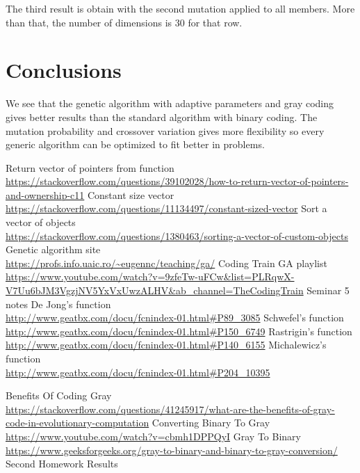 \documentclass[12pt,leqno]{article}
\begin{document}
The third result is obtain with the second mutation applied to all members. More than that, the number of dimensions is 30 for that row.

\section{Conclusions}
  We see that the genetic algorithm with adaptive parameters and gray coding gives better results than the standard algorithm with
  binary coding. The mutation probability and crossover variation gives more flexibility so every generic algorithm can be optimized
  to fit better in problems.

\newpage

\begin{thebibliography}{9}
  \bibitem{}
    Return vector of pointers from function \\
    \url{https://stackoverflow.com/questions/39102028/how-to-return-vector-of-pointers-and-ownership-c11}
  \bibitem{}
    Constant size vector \\
    \url{https://stackoverflow.com/questions/11134497/constant-sized-vector}
  \bibitem{}
    Sort a vector of objects \\
    \url{https://stackoverflow.com/questions/1380463/sorting-a-vector-of-custom-objects}  
  \bibitem{}
    Genetic algorithm site \\
    \url{https://profs.info.uaic.ro/~eugennc/teaching/ga/}  
  \bibitem{}
    Coding Train GA playlist \\
    \url{https://www.youtube.com/watch?v=9zfeTw-uFCw&list=PLRqwX-V7Uu6bJM3VgzjNV5YxVxUwzALHV&ab_channel=TheCodingTrain}  
  \bibitem{}
    Seminar 5 notes
  \bibitem{}
    De Jong's function \\
    \url{http://www.geatbx.com/docu/fcnindex-01.html#P89_3085}
  \bibitem{}
    Schwefel's function \\
    \url{http://www.geatbx.com/docu/fcnindex-01.html#P150_6749}
  \bibitem{}
    Rastrigin's function \\
    \url{http://www.geatbx.com/docu/fcnindex-01.html#P140_6155}
  \bibitem{}
    Michalewicz's function \\
    \url{http://www.geatbx.com/docu/fcnindex-01.html#P204_10395}

  \bibitem{}
    Benefits Of Coding Gray \\
    \url{https://stackoverflow.com/questions/41245917/what-are-the-benefits-of-gray-code-in-evolutionary-computation}
  \bibitem{}
    Converting Binary To Gray \\
    \url{https://www.youtube.com/watch?v=cbmh1DPPQyI}
  \bibitem{}
    Gray To Binary \\
    \url{https://www.geeksforgeeks.org/gray-to-binary-and-binary-to-gray-conversion/}
  \bibitem{}
    Second Homework Results

  \end{thebibliography}  
  
\end{document}
